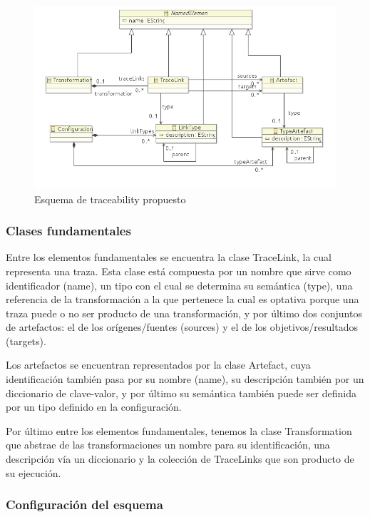 \documentclass[a4paper,12pt,oneside,spanish]{book}
\begin{document}
\begin{figure}[hbtp]
\centering
\includegraphics[scale=0.75]{./img/Esquema}
\caption{Esquema de traceability propuesto}
\label{fig:EsquenaPropuesto}
\end{figure}


\subsubsection{Clases fundamentales}

Entre los elementos fundamentales se encuentra la clase TraceLink, la cual representa una traza. Esta clase está compuesta por un nombre que sirve como identificador (name), un tipo con el cual se determina su semántica (type), una referencia de la transformación a la que pertenece la cual es optativa porque una traza puede o no ser producto de una transformación, y por último dos conjuntos de artefactos: el de los orígenes/fuentes (sources) y el de los objetivos/resultados (targets).

Los artefactos se encuentran representados por la clase Artefact, cuya identificación también pasa por su nombre (name), su descripción también por un diccionario de clave-valor, y por último su semántica también puede ser definida por un tipo definido en la configuración.

Por último entre los elementos fundamentales, tenemos la clase Transformation que abstrae de las transformaciones un nombre para su identificación, una descripción vía un diccionario y la colección de TraceLinks que son producto de su ejecución.


\subsubsection{Configuración del esquema}
\end{document}
